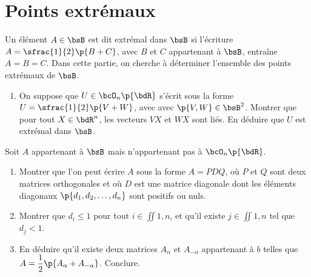 \documentclass[a4paper,french,bookmarks]{article}
\begin{document}
    \section{Points extrémaux}
    
    Un élément $A \in \bsB$ est dit extrémal dans $\bsB$ si l’écriture $A = \sfrac{1}{2}\p{B + C}$, avec $B$ et $C$ appartenant à $\bsB$, entraîne $A = B = C$. Dans cette partie, on cherche à déterminer l’ensemble des points extrémaux de $\bsB$.
    
    \begin{enumerate}
        \item On suppose que $U \in \bcO_n\p{\bdR}$ s'écrit sous la forme $U = \sfrac{1}{2}\p{V + W}$, avec avec $\p{V, W} \in \bsB^2$. Montrer que pour tout $X \in \bdR^n$, les vecteurs $VX$ et $WX$ sont liés. En déduire que $U$ est extrémal dans $\bsB$.
        
        \noafter
    \end{enumerate}
    
    Soit $A$ appartenant à $\bsB$ mais n'appartenant pas à $\bcO_n\p{\bdR}$.
    
    \begin{enumerate}[resume]
        \item Montrer que l'on peut écrire $A$ sous la forme $A = PDQ$, où $P$ et $Q$ sont deux matrices orthogonales et où $D$ est une matrice diagonale dont les éléments diagonaux $\p{d_1, d_2, \dots, d_n}$ sont positifs ou nuls.
        
        \item Montrer que $d_i \leq 1$ pour tout $i \in \iint{1, n}$, et qu'il existe $j \in \iint{1, n}$ tel que $d_j < 1$.
        
        \item En déduire qu’il existe deux matrices $A_\alpha$ et $A_{-\alpha}$ appartenant à $b$ telles que $A = \dfrac{1}{2}\p{A_\alpha + A_{-\alpha}}$. Conclure.

    \end{enumerate}
    
\end{document}

